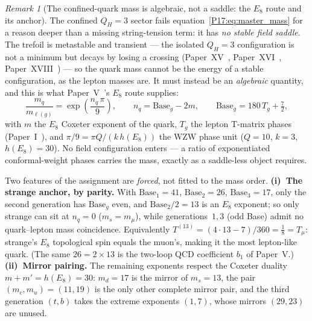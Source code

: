 \documentclass[11pt,a4paper]{article}
\theoremstyle{definition}\newtheorem{definition}[theorem]{Definition}
\theoremstyle{remark}
\newtheorem{remark}[theorem]{Remark}
\newcommand{\QH}{Q_H}
\begin{document}
\begin{remark}[The confined-quark mass is algebraic, not a saddle: the $E_8$ route and its anchor]
\label{P17:rem:quark_mass_algebraic}
The confined $\QH=3$ sector fails equation~\eqref{P17:eq:master_mass} for a
reason deeper than a missing string-tension term: it has \emph{no stable
field saddle}. The trefoil is metastable and transient --- the isolated
$\QH=3$ configuration is not a minimum but decays by losing a crossing
(Paper~XV~\cite{Paper15}, Paper~XVI~\cite{Paper16}, Paper~XVIII~\cite{Paper18})
--- so the quark mass cannot be the energy of a stable configuration, as the
lepton masses are. It must instead be an \emph{algebraic} quantity, and this
is what Paper~V~\cite{Paper5}'s $E_8$ route supplies:
\begin{equation}
  \frac{m_q}{m_{\ell(g)}} = \exp\!\left(\frac{n_q\,\pi}{9}\right),
  \qquad
  n_q = \mathrm{Base}_g - 2m,
  \qquad
  \mathrm{Base}_g = 180\,T_g + \tfrac72,
  \label{P17:eq:e8_quark_ratio}
\end{equation}
with $m$ the $E_8$ Coxeter exponent of the quark, $T_g$ the lepton T-matrix
phases (Paper~I~\cite{Paper1}), and $\pi/9=\pi Q/(k\,h(E_8))$ the WZW phase
unit ($Q=10$, $k=3$, $h(E_8)=30$). No field configuration enters --- a ratio
of exponentiated conformal-weight phases carries the mass, exactly as a
saddle-less object requires.

Two features of the assignment are \emph{forced}, not fitted to the mass
order. \textbf{(i)~The strange anchor, by parity.} With
$\mathrm{Base}_1=41$, $\mathrm{Base}_2=26$, $\mathrm{Base}_3=17$, only the
second generation has $\mathrm{Base}_g$ even, and $\mathrm{Base}_2/2=13$ is
an $E_8$ exponent; so only strange can sit at $n_q=0$ ($m_s=m_\mu$), while
generations~$1,3$ (odd Base) admit no quark--lepton mass coincidence.
Equivalently $T^{(13)}=(4\cdot13-7)/360=\tfrac18=T_\mu$: strange's $E_8$
topological spin equals the muon's, making it the most lepton-like quark.
(The same $26=2\times13$ is the two-loop QCD coefficient $b_1$ of Paper~V.)
\textbf{(ii)~Mirror pairing.} The remaining exponents respect the Coxeter
duality $m+m'=h(E_8)=30$: $m_d=17$ is the mirror of $m_s=13$, the pair
$(m_c,m_u)=(11,19)$ is the only other complete mirror pair, and the third
generation $(t,b)$ takes the extreme exponents $(1,7)$, whose mirrors
$(29,23)$ are unused.


\end{remark}
\end{document}
